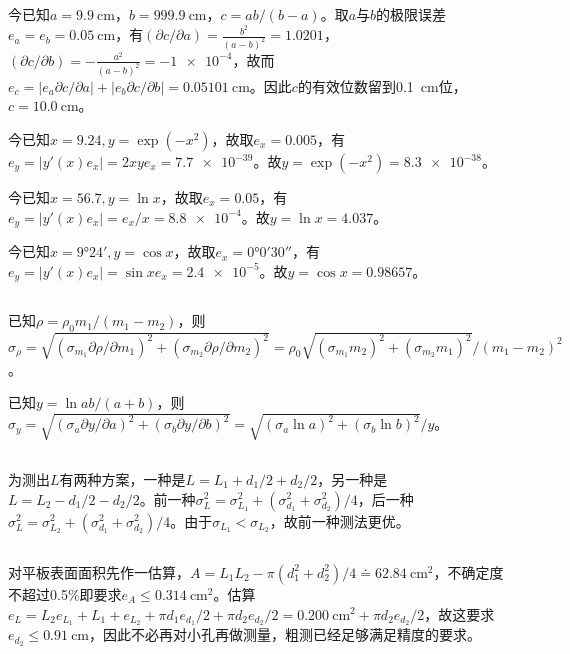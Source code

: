 \documentclass[UTF8]{ctexart}
\begin{document}
\subsection{}
今已知$a=\SI{9.9}{\cm}$，$b=\SI{999.9}{\cm}$，$c=ab/(b-a)$。取$a$与$b$的极限误差$e_a=e_b=\SI{0.05}{\cm}$，有$(\partial c/\partial a)=\frac{b^2}{(a-b)^2}=1.0201$，$(\partial c/\partial b)=-\frac{a^2}{(a-b)^2}=\num{-1e-4}$，故而$e_c=\lvert e_a\partial c/\partial a\rvert+\lvert e_b\partial c/\partial b\rvert=\SI{0.05101}{\cm}$。因此$c$的有效位数留到\SI{0.1}{\cm}位，$c=\SI{10.0}{\cm}$。

今已知$x=9.24, y=\exp{(-x^2)}$，故取$e_x=0.005$，有 $e_y=\lvert y'(x)e_x\rvert=2xye_x=\num{7.7e-39}$。故$y=\exp{(-x^2)}=\num{8.3e-38}$。

今已知$x=56.7, y=\ln{x}$，故取$e_x=0.05$，有 $e_y=\lvert y'(x)e_x\rvert=e_x/x=\num{8.8e-4}$。故$y=\ln{x}=\num{4.037}$。

今已知$x=\ang{9;24;}, y=\cos{x}$，故取$e_x=\ang{0;0;30}$，有 $e_y=\lvert y'(x)e_x\rvert=\sin{x}e_x=\num{2.4e-5}$。故$y=\cos{x}=\num{0.98657}$。
\subsection{}
已知$\rho=\rho_0m_1/(m_1-m_2)$，则$\sigma_{\rho}=\sqrt{(\sigma_{m_1}\partial\rho/\partial m_1)^2+(\sigma_{m_2}\partial\rho/\partial m_2)^2}=\rho_0\sqrt{(\sigma_{m_1}m_2)^2+(\sigma_{m_2}m_1)^2}/(m_1-m_2)^2$。

已知$y=\ln{ab/(a+b)}$，则$\sigma_y=\sqrt{(\sigma_{a}\partial y/\partial a)^2+(\sigma_b\partial y/\partial b)^2}=\sqrt{(\sigma_a\ln{a})^2+(\sigma_b\ln{b})^2}/y$。
\subsection{}
为测出$L$有两种方案，一种是$L=L_1+d_1/2+d_2/2$，另一种是$L=L_2-d_1/2-d_2/2$。前一种$\sigma_L^2=\sigma_{L_1}^2+(\sigma_{d_1}^2+\sigma_{d_2}^2)/4$，后一种$\sigma_L^2=\sigma_ {L_2}^2+(\sigma_{d_1}^2+\sigma_{d_2}^2)/4$。由于$\sigma_{L_1}<\sigma_{L_2}$，故前一种测法更优。
\subsection{}
对平板表面面积先作一估算，$A=L_1L_2-\pi(d_1^2+d_2^2)/4\doteq\SI{62.84}{\cm\squared}$，不确定度不超过0.5\%即要求$e_A\leq\SI{0.314}{\cm\squared}$。估算$e_L=L_2e_{L_1}+L_1+e_{L_2}+\pi d_1e_{d_1}/2+\pi d_2e_{d_2}/2=\SI{0.200}{\cm\squared}+\pi d_2e_{d_2}/2$，故这要求$e_{d_2}\leq\SI{0.91}{\cm}$，因此不必再对小孔再做测量，粗测已经足够满足精度的要求。
\end{document}
